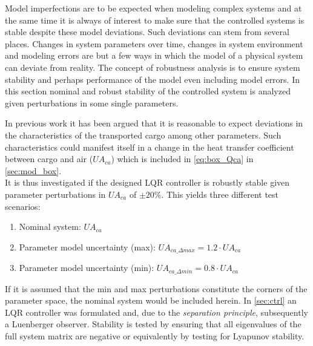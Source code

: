 
Model imperfections are to be expected when modeling complex systems and at the same time it is always of interest to make sure that the controlled systems is stable despite these model deviations. Such deviations can stem from several places. Changes in system parameters over time, changes in system environment and modeling errors are but a few ways in which the model of a physical system can deviate from reality. The concept of robustness analysis is to ensure system stability and perhaps performance of the model even including model errors. In this section nominal and robust stability of the controlled system is analyzed given perturbations in some single parameters.

In previous work \cite{Borlum2016} it has been argued that it is reasonable to expect deviations in the characteristics of the transported cargo among other parameters. Such characteristics could manifest itself in a change in the heat transfer coefficient between cargo and air ($U A_{ca}$) which is included in \cref{eq:box_Qca} in \cref{sec:mod_box}.\\

\noindent It is thus investigated if the designed LQR controller is robustly stable given parameter perturbations in $U A_{ca}$ of $\pm 20 \%$. This yields three different test scenarios:

\begin{enumerate}
	\item Nominal system: $U A_{ca}$
	\item Parameter model uncertainty (max): $U A_{ca\_\Delta max} = 1.2 \cdot U A_{ca}$
	\item Parameter model uncertainty (min): $U A_{ca\_\Delta min} = 0.8 \cdot U A_{ca}$
\end{enumerate}

\smallskip

\noindent If it is assumed that the min and max perturbations constitute the corners of the parameter space, the nominal system would be included herein. In \cref{sec:ctrl} an LQR controller was formulated and, due to the \textit{separation principle}, subsequently a Luenberger observer. Stability is tested by ensuring that all eigenvalues of the full system matrix are negative or equivalently by testing for Lyapunov stability.

